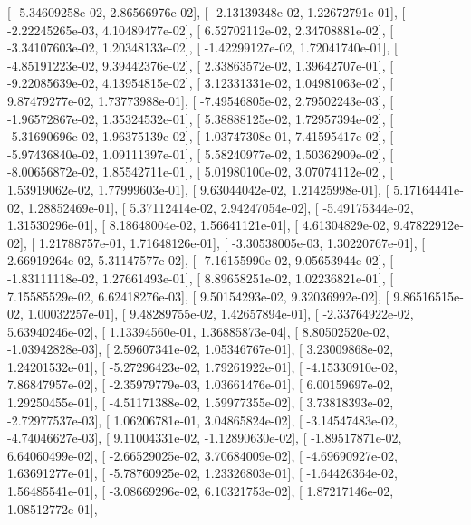 \documentclass{article}
\begin{document}
       [ -5.34609258e-02,   2.86566976e-02],
       [ -2.13139348e-02,   1.22672791e-01],
       [ -2.22245265e-03,   4.10489477e-02],
       [  6.52702112e-02,   2.34708881e-02],
       [ -3.34107603e-02,   1.20348133e-02],
       [ -1.42299127e-02,   1.72041740e-01],
       [ -4.85191223e-02,   9.39442376e-02],
       [  2.33863572e-02,   1.39642707e-01],
       [ -9.22085639e-02,   4.13954815e-02],
       [  3.12331331e-02,   1.04981063e-02],
       [  9.87479277e-02,   1.73773988e-01],
       [ -7.49546805e-02,   2.79502243e-03],
       [ -1.96572867e-02,   1.35324532e-01],
       [  5.38888125e-02,   1.72957394e-02],
       [ -5.31690696e-02,   1.96375139e-02],
       [  1.03747308e-01,   7.41595417e-02],
       [ -5.97436840e-02,   1.09111397e-01],
       [  5.58240977e-02,   1.50362909e-02],
       [ -8.00656872e-02,   1.85542711e-01],
       [  5.01980100e-02,   3.07074112e-02],
       [  1.53919062e-02,   1.77999603e-01],
       [  9.63044042e-02,   1.21425998e-01],
       [  5.17164441e-02,   1.28852469e-01],
       [  5.37112414e-02,   2.94247054e-02],
       [ -5.49175344e-02,   1.31530296e-01],
       [  8.18648004e-02,   1.56641121e-01],
       [  4.61304829e-02,   9.47822912e-02],
       [  1.21788757e-01,   1.71648126e-01],
       [ -3.30538005e-03,   1.30220767e-01],
       [  2.66919264e-02,   5.31147577e-02],
       [ -7.16155990e-02,   9.05653944e-02],
       [ -1.83111118e-02,   1.27661493e-01],
       [  8.89658251e-02,   1.02236821e-01],
       [  7.15585529e-02,   6.62418276e-03],
       [  9.50154293e-02,   9.32036992e-02],
       [  9.86516515e-02,   1.00032257e-01],
       [  9.48289755e-02,   1.42657894e-01],
       [ -2.33764922e-02,   5.63940246e-02],
       [  1.13394560e-01,   1.36885873e-04],
       [  8.80502520e-02,  -1.03942828e-03],
       [  2.59607341e-02,   1.05346767e-01],
       [  3.23009868e-02,   1.24201532e-01],
       [ -5.27296423e-02,   1.79261922e-01],
       [ -4.15330910e-02,   7.86847957e-02],
       [ -2.35979779e-03,   1.03661476e-01],
       [  6.00159697e-02,   1.29250455e-01],
       [ -4.51171388e-02,   1.59977355e-02],
       [  3.73818393e-02,  -2.72977537e-03],
       [  1.06206781e-01,   3.04865824e-02],
       [ -3.14547483e-02,  -4.74046627e-03],
       [  9.11004331e-02,  -1.12890630e-02],
       [ -1.89517871e-02,   6.64060499e-02],
       [ -2.66529025e-02,   3.70684009e-02],
       [ -4.69690927e-02,   1.63691277e-01],
       [ -5.78760925e-02,   1.23326803e-01],
       [ -1.64426364e-02,   1.56485541e-01],
       [ -3.08669296e-02,   6.10321753e-02],
       [  1.87217146e-02,   1.08512772e-01],
\end{document}
